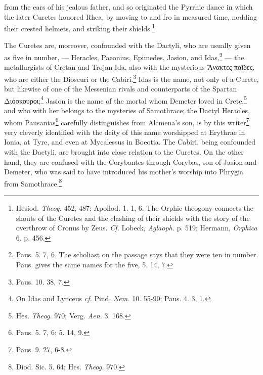 \documentclass[a4paper, 12pt, oneside]{article}
\begin{document}
from the ears of his jealous father, and so originated the Pyrrhic dance in which the later Curetes honored Rhea, by moving to and fro in measured time, nodding their crested helmets, and striking their shields.\footnote{Hesiod. \emph{Theog.} 452, 487; Apollod. 1. 1, 6. The Orphic theogony connects the shouts of the Curetes and the clashing of their shields with the story of the overthrow of Cronus by Zeus. \emph{Cf.} Lobeck, \emph{Aglaoph.} p. 519; Hermann, \emph{Orphica} 6. p. 456.}

The Curetes are, moreover, confounded with the Dactyli, who are usually given as five in number, --- Heracles, Paeonius, Epimedes, Jasion, and Idas,\footnote{Paus. 5. 7, 6. The scholiast on the passage says that they were ten in number. Paus. gives the same names for the five, 5. 14, 7.} --- the metallurgists of Cretan and Trojan Ida, also with the mysterious Ἄνακτες παῖδες, who are either the Dioscuri or the Cabiri.\footnote{Paus. 10. 38, 7.} Idas is the name, not only of a Curete, but likewise of one of the Messenian rivals and counterparts of the Spartan Διόσκουροι;\footnote{On Idas and Lynceus \emph{cf.} Pind. \emph{Nem.} 10. 55-90; Paus. 4. 3, 1.} Jasion is the name of the mortal whom Demeter loved in Crete,\footnote{Hes. \emph{Theog.} 970; Verg. \emph{Aen.} 3. 168.} and who with her belongs to the mysteries of Samothrace; the Dactyl Heracles, whom Pausanias\footnote{Paus. 5. 7, 6; 5. 14, 9.} carefully distinguishes from Alcmena's son, is by this writer\footnote{Paus. 9. 27, 6-8.} very cleverly identified with the deity of this name worshipped at Erythrae in Ionia, at Tyre, and even at Mycalessus in Boeotia. The Cabiri, being confounded with the Dactyli, are brought into close relation to the Curetes. On the other hand, they are confused with the Corybantes through Corybas, son of Jasion and Demeter, who was said to have introduced his mother's worship into Phrygia from Samothrace.\footnote{Diod. Sic. 5. 64; Hes. \emph{Theog.} 970.}
\end{document}
